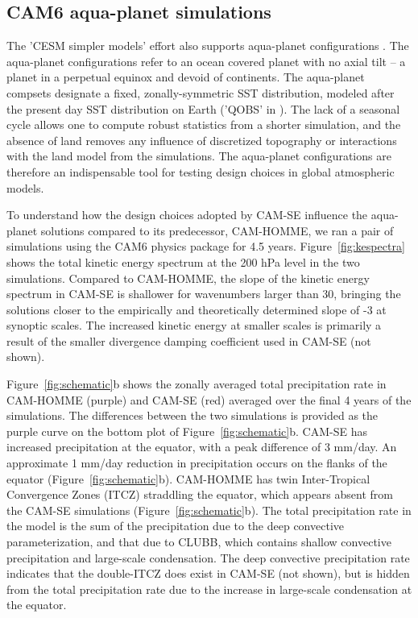 \subsection{CAM6 aqua-planet simulations}\label{sec:APE}
The 'CESM simpler models' effort also supports aqua-planet configurations \citep{MWO2016JAMES}. The aqua-planet configurations \citep{NH2000ASL} refer to an ocean covered planet with no axial tilt -- a planet in a perpetual equinox and devoid of continents. The aqua-planet compsets designate a fixed, zonally-symmetric SST distribution, modeled after the present day SST distribution on Earth ('QOBS' in \cite{NH2000ASL}). The lack of a seasonal cycle allows one to compute robust statistics from a shorter simulation, and the absence of land removes any influence of discretized topography or interactions with the land model from the simulations. The aqua-planet configurations are therefore an indispensable tool for testing design choices in global atmospheric models.

To understand how the design choices adopted by CAM-SE influence the aqua-planet solutions compared to its predecessor, CAM-HOMME, we ran a pair of simulations using the CAM6 physics package {\color{red}{[CAM6 reference]}} for 4.5 years. Figure~\ref{fig:kespectra} shows the total kinetic energy spectrum at the 200 hPa level in the two simulations. Compared to CAM-HOMME, the slope of the kinetic energy spectrum in CAM-SE is shallower for wavenumbers larger than 30, bringing the solutions closer to the empirically \citep{NG1985JAS} and theoretically \citep{C1971JAS} determined slope of -3 at synoptic scales. The increased kinetic energy at smaller scales is primarily a result of the smaller divergence damping coefficient used in CAM-SE (not shown).

 Figure~\ref{fig:schematic}b shows the zonally averaged total precipitation rate in CAM-HOMME (purple) and CAM-SE (red) averaged over the final 4 years of the simulations. The differences between the two simulations is provided as the purple curve on the bottom plot of Figure~\ref{fig:schematic}b. CAM-SE has increased precipitation at the equator, with a peak difference of 3 mm/day. An approximate 1 mm/day reduction in precipitation occurs on the flanks of the equator (Figure~\ref{fig:schematic}b). CAM-HOMME has twin Inter-Tropical Convergence Zones (ITCZ) straddling the equator, which appears absent from the CAM-SE simulations (Figure~\ref{fig:schematic}b). The total precipitation rate in the model is the sum of the precipitation due to the deep convective parameterization, and that due to CLUBB, which contains shallow convective precipitation and large-scale condensation. The deep convective precipitation rate indicates that the double-ITCZ does exist in CAM-SE (not shown), but is hidden from the total precipitation rate due to the increase in large-scale condensation at the equator.


